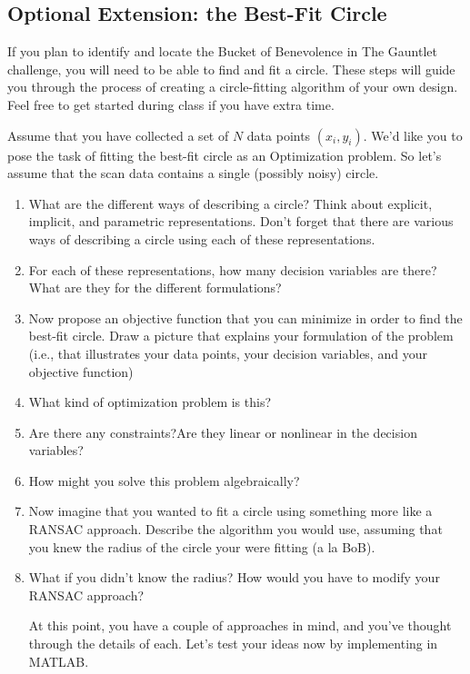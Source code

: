\documentclass{tufte-handout}
\begin{document}
\begin{enumerate}[series=exercises, label=\textbf{Exercise} (\arabic*)]
\begin{enumerate}[resume=exercises, label=\textbf{Exercise} (\arabic*)]
\begin{enumerate}[resume=exercises, label=\textbf{Exercise} (\arabic*)]
\begin{enumerate}[resume=exercises, label=\textbf{Exercise} (\arabic*)]
\begin{enumerate}[resume=exercises, label=\textbf{Exercise} (\arabic*)]
\section{Optional Extension: the Best-Fit Circle}

If you plan to identify and locate the Bucket of Benevolence in The Gauntlet challenge, you will need to be able to find and fit a circle. These steps will guide you through the process of creating a circle-fitting algorithm of your own design. Feel free to get started during class if you have extra time.


Assume that you have collected a set of $N$ data points $(x_i,y_i)$. We'd like you to pose the task of fitting the best-fit circle as an Optimization problem.  So let's assume that the scan data contains a single (possibly noisy) circle.

\begin{enumerate}[series=extension, label=\textbf{Extension} (\arabic*)]
\item What are the different ways of describing a circle? Think about explicit, implicit, and parametric representations. Don't forget that there are various ways of describing a circle using each of these representations.
\item For each of these representations, how many decision variables are there?  What are they for the different formulations?
\item Now propose an objective function that you can minimize in order to find the best-fit circle. 
Draw a picture that explains your formulation of the problem (i.e., that illustrates your data points, your decision variables, and your objective function)
\item What kind of optimization problem is this?
 \item Are there any constraints?Are they linear or nonlinear in the decision variables?
\item How might you solve this problem algebraically?  
\item Now imagine that you wanted to fit a circle using something more like a RANSAC approach.   Describe the algorithm you would use, assuming that you knew the radius of the circle your were fitting (a la BoB).
\item What if you didn't know the radius?  How would you have to modify your RANSAC approach?
\ee


At this point, you have a couple of approaches in mind, and you've thought through the details of each. Let's test your ideas now by implementing in MATLAB.


\end{enumerate}
\end{enumerate}
\end{enumerate}
\end{enumerate}
\end{enumerate}
\end{enumerate}
\end{document}
